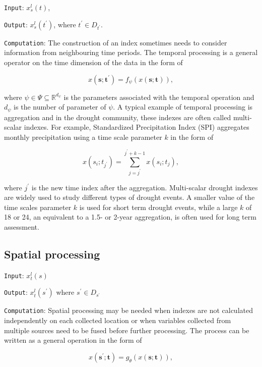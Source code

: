 \documentclass[
]{interact}
\begin{document}
\texttt{Input}: \(x^l_s(t)\),

\texttt{Output}: \(x^l_s(t^{\prime})\), where
\(t^\prime \in D_{t^{\prime}}\).

\texttt{Computation}: The construction of an index sometimes needs to
consider information from neighbouring time periods. The temporal
processing is a general operator on the time dimension of the data in
the form of

\begin{equation}
x(\mathbf{s};\mathbf{t}^\prime) = f_{\mathcal{\psi}}(x(\mathbf{s};\mathbf{t})),
\end{equation}

where \(\psi \in \Psi \subseteq \mathbb{R}^{d_{\psi}}\) is the
parameters associated with the temporal operation and \(d_{\psi}\) is
the number of parameter of \(\psi\). A typical example of temporal
processing is aggregation and in the drought community, these indexes
are often called multi-scalar indexes. For example, Standardized
Precipitation Index (SPI) aggregates monthly precipitation using a time
scale parameter \(k\) in the form of

\[x(s_i;t_{j^\prime}) = \sum_{j = j^\prime}^{j^\prime + k - 1}x(s_i; t_j),\]

where \(j^\prime\) is the new time index after the aggregation.
Multi-scalar drought indexes are widely used to study different types of
drought events. A smaller value of the time scales parameter \(k\) is
used for short term drought events, while a large \(k\) of 18 or 24, an
equivalent to a 1.5- or 2-year aggregation, is often used for long term
assessment.

\hypertarget{spatial-processing}{%
\subsection{Spatial processing}\label{spatial-processing}}

\texttt{Input}: \(x^l_t(s)\)

\texttt{Output}: \(x^l_t(s^\prime)\) where
\(s^\prime \in D_{s^{\prime}}\)

\texttt{Computation}: Spatial processing may be needed when indexes are
not calculated independently on each collected location or when
variables collected from multiple sources need to be fused before
further processing. The process can be written as a general operation in
the form of

\begin{equation}
x(\mathbf{s}^\prime;\mathbf{t}) = g_{\mathcal{\theta}}(x(\mathbf{s};\mathbf{t})),
\end{equation}
\end{document}
